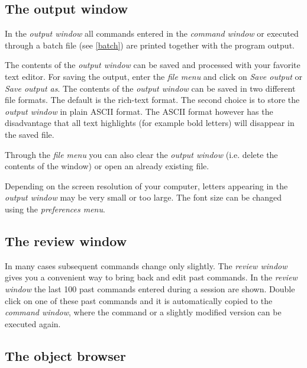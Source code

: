 \subsection{The output window}
 

In the {\em output window} all commands entered in the {\em
command window} or executed through a batch file (see
\autoref{batch}) are printed together with the program output.

 The contents of the {\em output window} can be
saved and processed with your favorite text editor. For saving the
output, enter the {\em file menu} and click on {\em Save output}
or {\em Save output as}. The contents of the {\em output window} can be
saved in two different file formats. The default is the rich-text
format. The second choice is to store the {\em output window} in plain
ASCII format. The ASCII format however has the disadvantage that
all text highlights (for example bold letters) will disappear in
the saved file.

Through the {\em file menu} you can also clear the {\em output window}
(i.e. delete the contents of the window) or open an already
existing file.

Depending on the screen resolution of your computer, letters
appearing in the {\em output window} may be very small or too large. The
font size can be changed  using the {\em preferences menu}.

\subsection{The review window}
 

In many cases subsequent commands change only slightly. The {\em
review window} gives you a convenient way to bring back and edit
past commands. In the {\em review window} the last 100 past commands
entered during a session are shown. Double click on one of these
past commands and it is automatically copied to the {\em command
window}, where the command or a slightly modified version can be
executed again.

\subsection{The object browser}

